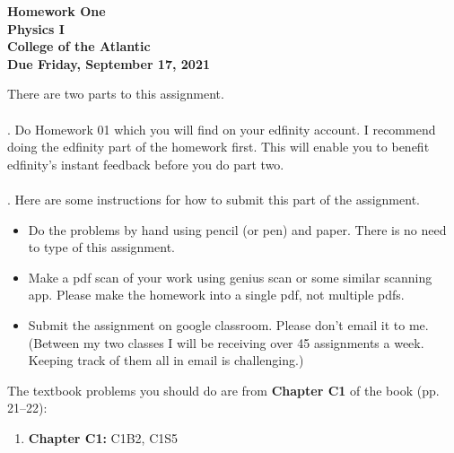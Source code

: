 \documentclass[12pt]{article}
\begin{document}
\pagestyle{empty}
 
\begin{center}
{\LARGE {\bf Homework One}}\\
\bigskip
{\Large {\bf Physics I}}\\
\bigskip
{\Large {\bf College of the Atlantic}}\\
\bigskip
{ {\bf Due Friday, September 17, 2021}}\\ 
\end{center}
\medskip


\noindent There are two parts to this assignment.\\

\hspace{2mm}\\

.  Do Homework 01 which you will find
on your edfinity account.  I recommend doing the edfinity part of the
homework first.  This will enable you to benefit edfinity's instant
feedback before you do part two.\\

\hspace{2mm}\\

.  Here are some
instructions for how to submit this part of the assignment.
\begin{itemize}
\item Do the problems by hand using pencil (or pen) and paper.
  There is no need to type of this assignment.
\item Make a pdf scan of your work using genius scan or some
  similar scanning app.  Please make the homework into a single
  pdf, not multiple pdfs.
\item Submit the assignment on google classroom.  Please don't
  email it to me.  (Between my two classes I will be receiving
  over 45 assignments a week.  Keeping track of them all in email
  is challenging.)\\
\end{itemize}

\noindent The textbook problems you should do are from {\bf Chapter
  C1} of the book (pp. 21--22):   

\begin{enumerate}
\setlength{\itemsep}{-1mm}
  \item {\bf Chapter C1:} C1B2, C1S5\\
\end{enumerate}
\end{document}
